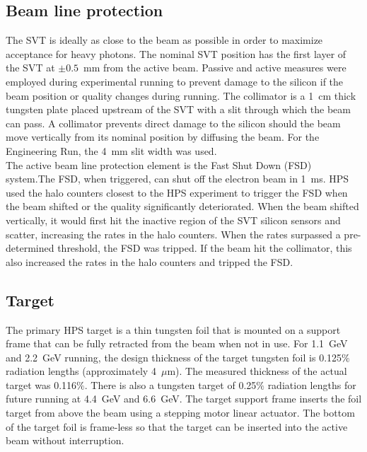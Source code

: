 \subsection{Beam line protection}
The SVT is ideally as close to the beam as possible in order to maximize acceptance for heavy photons. The nominal SVT position has the first layer of the SVT at $\pm0.5$~mm from the active beam. Passive and active measures were employed during experimental running to prevent damage to the silicon if the beam position or quality changes during running. The collimator is a 1~cm thick tungsten plate placed upstream of the SVT with a slit through which the beam can pass. A collimator prevents direct damage to the silicon should the beam move vertically from its nominal position by diffusing the beam. For the Engineering Run, the 4~mm slit width was used. \\
\indent The active beam line protection element is the Fast Shut Down (FSD) system.The FSD, when triggered, can shut off the electron beam in 1~ms. HPS used the halo counters closest to the HPS experiment to trigger the FSD when the beam shifted or the quality significantly deteriorated. When the beam shifted vertically, it would first hit the inactive region of the SVT silicon sensors and scatter, increasing the rates in the halo counters. When the rates surpassed a pre-determined threshold, the FSD was tripped. If the beam hit the collimator, this also increased the rates in the halo counters and tripped the FSD. 

\subsection{Target}

The primary HPS target is a thin tungsten foil that is mounted on a support frame that can be fully retracted from the beam when not in use. For 1.1~GeV and 2.2~GeV running, the design thickness of the target tungsten foil is 0.125$\%$ radiation lengths (approximately 4~$\mu$m). The measured thickness of the actual target was 0.116$\%$. There is also a tungsten target of 0.25$\%$ radiation lengths for future running at 4.4~GeV and 6.6~GeV. The target support frame inserts the foil target from above the beam using a stepping motor linear actuator. The bottom of the target foil is frame-less so that the target can be inserted into the active beam without interruption.   


